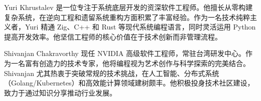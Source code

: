 Yuri Khrustalev 是一位专注于系统底层开发的资深软件工程师。他擅长从零构建复杂系统，在逆向工程和遗留系统重构方面积累了丰富经验。作为一名技术纯粹主义者，Yuri 精通 Zig、C++ 和 Rust 等现代系统编程语言，同时灵活运用 Python 提高开发效率。他坚信工程师的核心价值在于技术创新而非管理流程。

\hspace*{\fill}

Shivanjan Chakravorthy 现任 NVIDIA 高级软件工程师，常驻台湾研发中心。作为一名富有创造力的技术专家，他将编程视为艺术创作与科学探索的完美结合。Shivanjan 尤其热衷于突破常规的技术挑战，在人工智能、分布式系统（Golang/Kubernetes）和高效能计算领域建树颇丰。他积极投身技术社区建设，致力于通过知识分享推动行业发展。